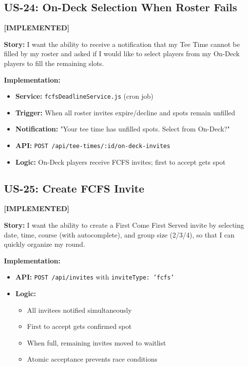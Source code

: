 \documentclass[11pt,a4paper]{article}
\newcommand{\implemented}{\textcolor{implemented}{\textbf{[IMPLEMENTED]}}}
\begin{document}
\subsection{US-24: On-Deck Selection When Roster Fails}
\implemented

\textbf{Story:} I want the ability to receive a notification that my Tee Time cannot be filled by my roster and asked if I would like to select players from my On-Deck players to fill the remaining slots.

\textbf{Implementation:}
\begin{itemize}[leftmargin=*]
  \item \textbf{Service:} \texttt{fcfsDeadlineService.js} (cron job)
  \item \textbf{Trigger:} When all roster invites expire/decline and spots remain unfilled
  \item \textbf{Notification:} "Your tee time has unfilled spots. Select from On-Deck?"
  \item \textbf{API:} \texttt{POST /api/tee-times/:id/on-deck-invites}
  \item \textbf{Logic:} On-Deck players receive FCFS invites; first to accept gets spot
\end{itemize}

\subsection{US-25: Create FCFS Invite}
\implemented

\textbf{Story:} I want the ability to create a First Come First Served invite by selecting date, time, course (with autocomplete), and group size (2/3/4), so that I can quickly organize my round.

\textbf{Implementation:}
\begin{itemize}[leftmargin=*]
  \item \textbf{API:} \texttt{POST /api/invites} with \texttt{inviteType: 'fcfs'}
  \item \textbf{Logic:}
    \begin{itemize}
      \item All invitees notified simultaneously
      \item First to accept gets confirmed spot
      \item When full, remaining invites moved to waitlist
      \item Atomic acceptance prevents race conditions
    \end{itemize}
\end{itemize}
\end{document}

